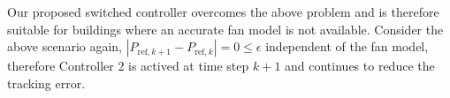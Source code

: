 Our proposed switched controller overcomes the above problem and is therefore suitable for buildings where an accurate fan model is not available. Consider the above scenario again, $|P_{\text{ref},k+1} - P_{\text{ref},k}| = 0 \leq \epsilon$ independent of the fan model, therefore Controller 2 is actived at time step $k+1$ and continues to reduce the tracking error.





